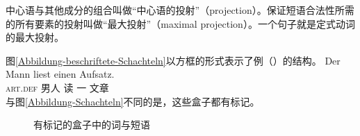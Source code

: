 中心语与其他成分的组合叫做“中心语的投射”（projection）。保证短语合法性所需的所有要素的投射叫做“最大投射”（maximal projection）。一个句子就是定式动词的最大投射。

图\vref{Abbildung-beschriftete-Schachteln}以方框的形式表示了例（）的结构。
\ea
\gll Der Mann liest einen Aufsatz.\\
	 \textsc{art}.\textsc{def}  男人 读 一 文章\\
\z
与图\ref{Abbildung-Schachteln}不同的是，这些盒子都有标记。
\begin{figure}
\centering
{}
\caption{\label{Abbildung-beschriftete-Schachteln}有标记的盒子中的词与短语}
\end{figure}%

